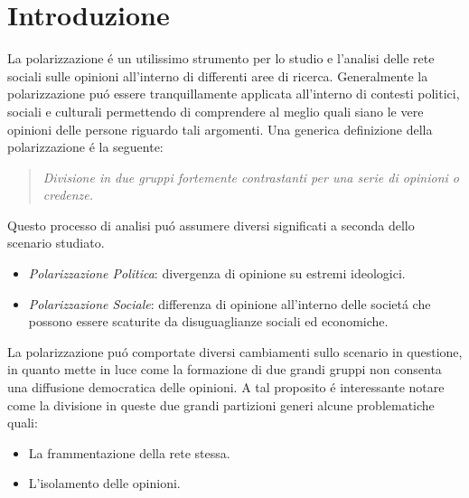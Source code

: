 \chapter{Introduzione}
\label{Introduzione}




La polarizzazione \'e un utilissimo strumento per lo studio e l'analisi delle rete sociali sulle opinioni all'interno di differenti aree di ricerca. Generalmente la polarizzazione pu\'o essere tranquillamente applicata all'interno di contesti politici, sociali e culturali permettendo di comprendere al meglio quali siano le vere opinioni delle persone riguardo tali argomenti. Una generica definizione della polarizzazione \'e la seguente:
\begin{quote} 
\textit{Divisione in due gruppi fortemente contrastanti per una serie di opinioni o credenze.}
\end{quote}
Questo processo di analisi pu\'o assumere diversi significati a seconda dello scenario studiato. 
\begin{itemize}
\item \textit{Polarizzazione Politica}: divergenza di opinione su estremi ideologici.
\item \textit{Polarizzazione Sociale}: differenza di opinione all'interno delle societ\'a che possono essere scaturite da disuguaglianze sociali ed economiche.

\end{itemize}

La polarizzazione pu\'o comportate diversi cambiamenti sullo scenario in questione, in quanto mette in luce come la formazione di due grandi gruppi non consenta una diffusione democratica delle opinioni. A tal proposito \'e interessante notare come la divisione in queste due grandi partizioni generi alcune problematiche quali:
\begin{itemize}
\item La frammentazione della rete stessa.
\item L'isolamento delle opinioni. 
\end{itemize} 

